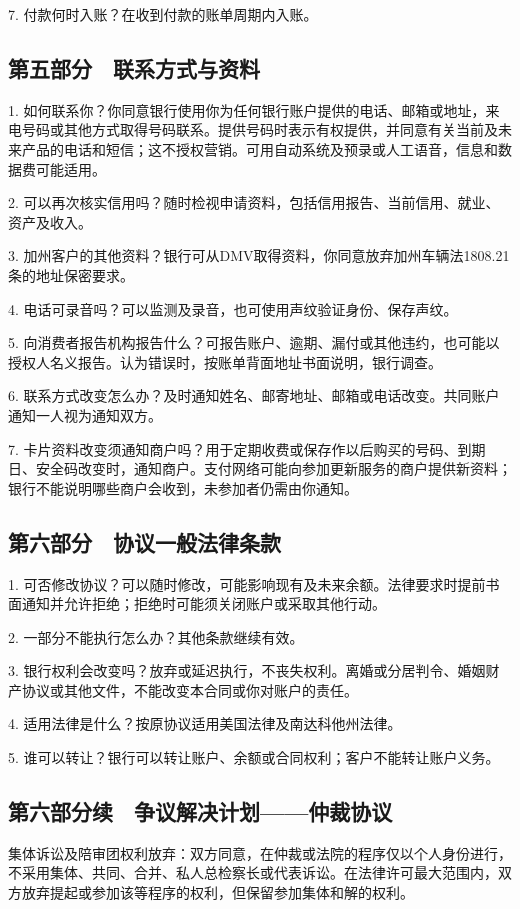 \documentclass[UTF8,fontset=none,11pt,a4paper]{ctexart}
\begin{document}
7. 付款何时入账？在收到付款的账单周期内入账。


\subsection*{第五部分　联系方式与资料}
1. 如何联系你？你同意银行使用你为任何银行账户提供的电话、邮箱或地址，来电号码或其他方式取得号码联系。提供号码时表示有权提供，并同意有关当前及未来产品的电话和短信；这不授权营销。可用自动系统及预录或人工语音，信息和数据费可能适用。


2. 可以再次核实信用吗？随时检视申请资料，包括信用报告、当前信用、就业、资产及收入。


3. 加州客户的其他资料？银行可从DMV取得资料，你同意放弃加州车辆法1808.21条的地址保密要求。


4. 电话可录音吗？可以监测及录音，也可使用声纹验证身份、保存声纹。


5. 向消费者报告机构报告什么？可报告账户、逾期、漏付或其他违约，也可能以授权人名义报告。认为错误时，按账单背面地址书面说明，银行调查。


6. 联系方式改变怎么办？及时通知姓名、邮寄地址、邮箱或电话改变。共同账户通知一人视为通知双方。


7. 卡片资料改变须通知商户吗？用于定期收费或保存作以后购买的号码、到期日、安全码改变时，通知商户。支付网络可能向参加更新服务的商户提供新资料；银行不能说明哪些商户会收到，未参加者仍需由你通知。


\subsection*{第六部分　协议一般法律条款}
1. 可否修改协议？可以随时修改，可能影响现有及未来余额。法律要求时提前书面通知并允许拒绝；拒绝时可能须关闭账户或采取其他行动。


2. 一部分不能执行怎么办？其他条款继续有效。


3. 银行权利会改变吗？放弃或延迟执行，不丧失权利。离婚或分居判令、婚姻财产协议或其他文件，不能改变本合同或你对账户的责任。


4. 适用法律是什么？按原协议适用美国法律及南达科他州法律。


5. 谁可以转让？银行可以转让账户、余额或合同权利；客户不能转让账户义务。


\subsection*{第六部分续　争议解决计划——仲裁协议}
集体诉讼及陪审团权利放弃：双方同意，在仲裁或法院的程序仅以个人身份进行，不采用集体、共同、合并、私人总检察长或代表诉讼。在法律许可最大范围内，双方放弃提起或参加该等程序的权利，但保留参加集体和解的权利。
\end{document}
